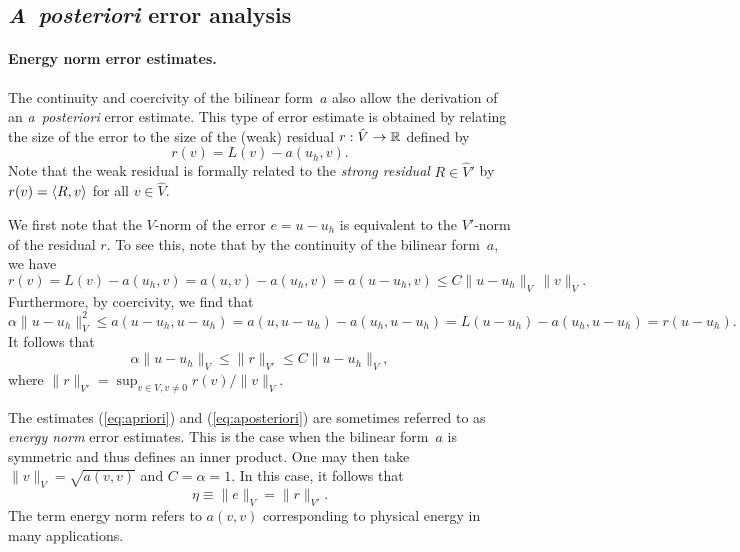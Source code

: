 \subsection{\emph{A~posteriori} error analysis}

\paragraph{Energy norm error estimates.}

The continuity and coercivity of the bilinear form~$a$ also allow the
derivation of an \emph{a~posteriori} error estimate. This type of error
estimate is obtained by relating the size of the error to the size of
the (weak) residual $r : \hat{V} \rightarrow \mathbb{R}$ defined by
\begin{equation} \label{eq:residual,weak}
  r(v) = L(v) - a(u_h, v).
\end{equation}
Note that the weak residual is formally related to the \emph{strong
  residual} $R \in \hat{V}'$ by $r(v) = \langle R, v \rangle$ for all $v \in
\hat{V}$.

We first note that the $V$-norm of the error $e = u - u_h$ is
equivalent to the $V'$-norm of the residual $r$. To see this, note
that by the continuity of the bilinear form~$a$, we have
\begin{equation}
  r(v)
  = L(v) - a(u_h, v) = a(u, v) - a(u_h, v) = a(u - u_h, v)
  \leqslant C \|u - u_h\|_V \, \|v\|_V.
\end{equation}
Furthermore, by coercivity, we find that
\begin{equation}
  \alpha \|u - u_h\|^2_V
  \leqslant a(u - u_h, u - u_h)
  = a(u, u - u_h) - a(u_h, u - u_h)
  = L(u - u_h) - a(u_h, u - u_h) = r(u - u_h).
\end{equation}
It follows that
\begin{equation} \label{eq:aposteriori}
  \alpha \|u - u_h\|_V \leqslant \|r\|_{V'} \leqslant C \|u - u_h\|_V,
\end{equation}
where $\|r\|_{V'} = \sup_{v \in V, v \neq 0} r(v)/ \|v\|_V$.

The estimates (\ref{eq:apriori}) and (\ref{eq:aposteriori}) are
sometimes referred to as \emph{energy norm} error estimates. This is
the case when the bilinear form~$a$ is symmetric and thus defines an
inner product. One may then take $\|v\|_V = \sqrt{a(v, v)}$ and $C =
\alpha = 1$. In this case, it follows that
\begin{equation} \label{eq:aposteriori,energynorm}
  \eta \equiv \|e\|_V = \|r\|_{V'}.
\end{equation}
The term energy norm refers to $a(v, v)$ corresponding to physical
energy in many applications.


